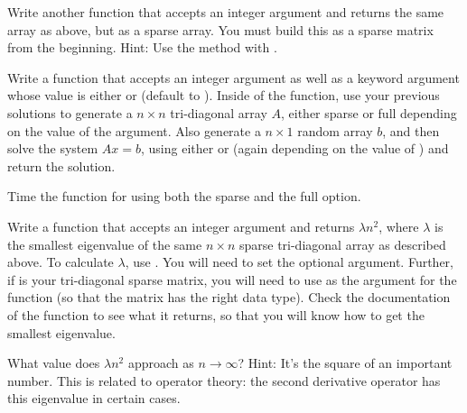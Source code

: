 \begin{problem}
Write another function that accepts an integer argument  and returns the same
array as above, but as a sparse array.
You must build this as a sparse matrix from the beginning.
Hint: Use the  method with .
\label{prob:sparse_tridiag}
\end{problem}

\begin{problem}
Write a function that accepts an integer argument  as well as a keyword argument
 whose value is either  or  (default to ).
Inside of the function, use your previous solutions to generate a $n \times n$ tri-diagonal
array $A$, either sparse or full depending on the value of the  argument.
Also generate a $n \times 1$ random array $b$, and then solve the system $Ax = b$,
using either  or 
(again depending on the value of ) and return the solution.

Time the function for  using both the sparse and the full option.
\end{problem}

\begin{problem}
Write a function that accepts an integer argument  and returns $\lambda n^2$, where
$\lambda$ is the smallest eigenvalue of the same $n \times n$ sparse tri-diagonal array as described above.
To calculate $\lambda$, use . You will need to set the 
optional argument. Further, if  is your tri-diagonal sparse matrix, you will need to use
 as the argument for the  function (so that the matrix has the right data type).
Check the documentation of the  function to see what it returns, so that you will know how to
get the smallest eigenvalue.

What value does $\lambda n^2$ approach as $n \rightarrow \infty$?
Hint: It's the square of an important number.
This is related to operator theory: the second derivative operator has this eigenvalue in certain cases.
\end{problem}

